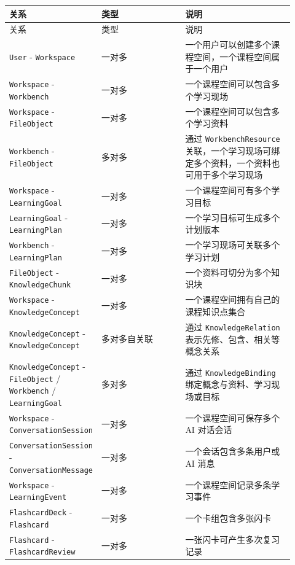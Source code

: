\documentclass[10pt,a4paper,fontset=none]{ctexart}
\begin{document}
\begingroup\scriptsize
\renewcommand{\arraystretch}{1.18}
\setlength{\LTleft}{0pt}
\setlength{\LTright}{0pt}
\begin{longtable}{>{\raggedright\arraybackslash}p{0.18\linewidth}>{\raggedright\arraybackslash}p{0.34\linewidth}>{\raggedright\arraybackslash}p{0.40\linewidth}}
\toprule
关系 & 类型 & 说明 \\
\midrule
\endfirsthead
\toprule
关系 & 类型 & 说明 \\
\midrule
\endhead
\texttt{User} - \texttt{Workspace} & 一对多 & 一个用户可以创建多个课程空间，一个课程空间属于一个用户 \\
\texttt{Workspace} - \texttt{Workbench} & 一对多 & 一个课程空间可以包含多个学习现场 \\
\texttt{Workspace} - \texttt{FileObject} & 一对多 & 一个课程空间可以包含多个学习资料 \\
\texttt{Workbench} - \texttt{FileObject} & 多对多 & 通过 \texttt{WorkbenchResource} 关联，一个学习现场可绑定多个资料，一个资料也可用于多个学习现场 \\
\texttt{Workspace} - \texttt{LearningGoal} & 一对多 & 一个课程空间可有多个学习目标 \\
\texttt{LearningGoal} - \texttt{LearningPlan} & 一对多 & 一个学习目标可生成多个计划版本 \\
\texttt{Workbench} - \texttt{LearningPlan} & 一对多 & 一个学习现场可关联多个学习计划 \\
\texttt{FileObject} - \texttt{KnowledgeChunk} & 一对多 & 一个资料可切分为多个知识块 \\
\texttt{Workspace} - \texttt{KnowledgeConcept} & 一对多 & 一个课程空间拥有自己的课程知识点集合 \\
\texttt{KnowledgeConcept} - \texttt{KnowledgeConcept} & 多对多自关联 & 通过 \texttt{KnowledgeRelation} 表示先修、包含、相关等概念关系 \\
\texttt{KnowledgeConcept} - \texttt{FileObject} / \texttt{Workbench} / \texttt{LearningGoal} & 多对多 & 通过 \texttt{KnowledgeBinding} 绑定概念与资料、学习现场或目标 \\
\texttt{Workspace} - \texttt{ConversationSession} & 一对多 & 一个课程空间可保存多个 AI 对话会话 \\
\texttt{ConversationSession} - \texttt{ConversationMessage} & 一对多 & 一个会话包含多条用户或 AI 消息 \\
\texttt{Workspace} - \texttt{LearningEvent} & 一对多 & 一个课程空间记录多条学习事件 \\
\texttt{FlashcardDeck} - \texttt{Flashcard} & 一对多 & 一个卡组包含多张闪卡 \\
\texttt{Flashcard} - \texttt{FlashcardReview} & 一对多 & 一张闪卡可产生多次复习记录 \\
\bottomrule
\end{longtable}
\endgroup
\end{document}

